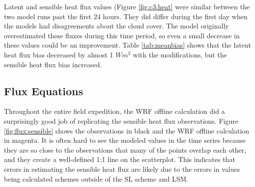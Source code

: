 {Latent and sensible heat flux values (Figure \ref{fig:c3:heat} were similar between the two model runs past the first 24 hours. They did differ during the first day when the models had disagreements about the cloud cover. The model originally overestimated these fluxes during this time period, so even a small decrease in these values could be an improvement. Table \ref{tab:meanbias} shows that the latent heat flux bias decreased by almost 1 $Wm^{2}$ with the modifications, but the sensible heat flux bias increased. 

\subsection{Flux Equations}

Throughout the entire field expedition, the WRF offline calculation did a surprisingly good job of replicating the sensible heat flux observations. Figure \ref{fig:flux:sensible} shows the observations in black and the WRF offline calculation in magenta. It is often hard to see the modeled values in the time series because they are so close to the observations that many of the points overlap each other, and they create a well-defined 1:1 line on the scatterplot. This indicates that errors in estimating the sensible heat flux are likely due to the errors in values being calculated schemes outside of the SL scheme and LSM. 

}
